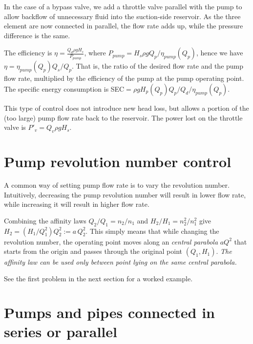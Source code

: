 In the case of a bypass valve, we add a throttle valve parallel with the pump to allow backflow of unnecessary fluid into the suction-side reservoir.  As the three element are now connected in parallel, the flow rate adds up, while the pressure difference is the same. 

The efficiency is $\eta=\frac{Q_d \rho g H_s}{P_{pump}}$, where $P_{pump}=H_s\rho g Q_p/\eta_{pump}(Q_p)$, hence we have $\eta=\eta_{pump}(Q_p)Q_s/Q_p$. That is, the ratio of the desired flow rate and the pump flow rate, multiplied by the efficiency of the pump at the pump operating point. The specific energy consumption is SEC$=\rho g H_p(Q_p)Q_p/Q_d /\eta_{pump}(Q_p)$.

This type of control does not introduce new head loss, but allows a portion of the (too large) pump flow rate back to the reservoir. The power lost on the throttle valve is $P'_v=Q_v \rho g H_s$.

\section{Pump revolution number control}

A common way of setting pump flow rate is to vary the revolution number. Intuitively, decreasing the pump revolution number will result in lower flow rate, while increasing it will result in higher flow rate.

Combining the affinity laws $Q_2/Q_1=n_2/n_1$ and $H_2/H_1=n_2^2/n_1^2$ give $H_2=\left( H_1/Q_1^2\right)Q_2^2:=a\,Q_2^2$. This simply means that while changing the revolution number, the operating point moves along an \emph{central parabola} $a Q^2$ that starts from the origin and passes through the original point $\left( Q_1,H_1\right)$. \emph{The affinity law can be used only between point lying on the same central parabola.}

See the first problem in the next section for a worked example.




\section{Pumps and pipes connected in series or parallel}

